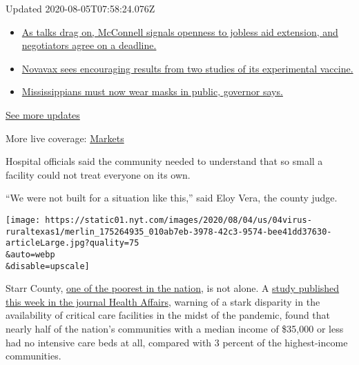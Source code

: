 Updated 2020-08-05T07:58:24.076Z

\begin{itemize}
\tightlist
\item
  \href{https://www.nytimes.com/2020/08/04/world/coronavirus-cases.html?action=click\&pgtype=Article\&state=default\&region=MAIN_CONTENT_1\&context=storylines_live_updates\#link-762df92}{As
  talks drag on, McConnell signals openness to jobless aid extension,
  and negotiators agree on a deadline.}
\item
  \href{https://www.nytimes.com/2020/08/04/world/coronavirus-cases.html?action=click\&pgtype=Article\&state=default\&region=MAIN_CONTENT_1\&context=storylines_live_updates\#link-1228a480}{Novavax
  sees encouraging results from two studies of its experimental
  vaccine.}
\item
  \href{https://www.nytimes.com/2020/08/04/world/coronavirus-cases.html?action=click\&pgtype=Article\&state=default\&region=MAIN_CONTENT_1\&context=storylines_live_updates\#link-794484ed}{Mississippians
  must now wear masks in public, governor says.}
\end{itemize}

\href{https://www.nytimes.com/2020/08/04/world/coronavirus-cases.html?action=click\&pgtype=Article\&state=default\&region=MAIN_CONTENT_1\&context=storylines_live_updates}{See
more updates}

More live coverage:
\href{https://www.nytimes.com/live/2020/08/04/business/stock-market-today-coronavirus?action=click\&pgtype=Article\&state=default\&region=MAIN_CONTENT_1\&context=storylines_live_updates}{Markets}

Hospital officials said the community needed to understand that so small
a facility could not treat everyone on its own.

``We were not built for a situation like this,'' said Eloy Vera, the
county judge.

\texttt{[image: https://static01.nyt.com/images/2020/08/04/us/04virus-ruraltexas1/merlin\_175264935\_010ab7eb-3978-42c3-9574-bee41dd37630-articleLarge.jpg?quality=75\\\&auto=webp\\\&disable=upscale]}

Starr County,
\href{https://www.usatoday.com/story/money/2019/01/25/poorest-counties-in-the-us-median-household-income/38870175/}{one
of the poorest in the nation}, is not alone. A
\href{https://www.healthaffairs.org/doi/10.1377/hlthaff.2020.00581}{study
published this week in the journal Health Affairs}, warning of a stark
disparity in the availability of critical care facilities in the midst
of the pandemic, found that nearly half of the nation's communities with
a median income of \$35,000 or less had no intensive care beds at all,
compared with 3 percent of the highest-income communities.

